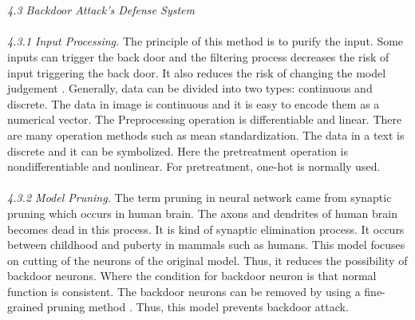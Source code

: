 \documentclass{article}
\begin{document}
\\\\
\textit{4.3 Backdoor Attack’s Defense System}
\\\\
\textit{4.3.1 Input Processing.}
The principle of this method is to purify the input. Some inputs can trigger the back door and the filtering process decreases the risk of input triggering the back door. It also reduces the risk of changing the model judgement \cite{liu2017neural}. Generally, data can be divided into two types: continuous and discrete. The data in image is continuous and it is easy to encode them as a numerical vector. The Preprocessing operation is differentiable and linear. There are many operation methods such as mean standardization. The data in a text is discrete and it can be symbolized. Here the pretreatment operation is nondifferentiable and nonlinear. For pretreatment, one-hot is normally used.
\\\\
\textit{4.3.2 Model Pruning.}
The term pruning in neural network came from synaptic pruning which occurs in human brain. The axons and dendrites of human brain becomes dead in this process. It is kind of synaptic elimination process. It occurs between childhood and puberty in mammals such as humans. This model focuses on cutting of the neurons of the original model. Thus, it reduces the possibility of backdoor neurons. Where the condition for backdoor neuron is that normal function is consistent. The backdoor neurons can be removed by using a fine-grained pruning method \cite{liu2018fine}. Thus, this model prevents backdoor attack. 
\\\\




\end{document}
